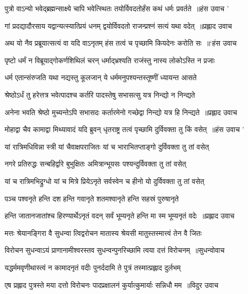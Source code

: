 \threelineshloka
{पुत्रो वाऽन्यो भवेद्ब्रह्मन्साक्ष्ये चापि भवेत्स्थितः}
{तयोर्विवदतोर्हंस कथं धर्मः प्रवर्तते ॥हंस उवाच}
{'}


\threelineshloka
{गां प्रदद्यादौरसाय यद्वान्यत्स्यात्प्रियं धनम्}
{द्वयोर्विवदतो राजन्प्रश्नं सत्यं यथा वदेत् ॥प्रह्लाद उवाच}
{}


\twolineshloka
{अथ यो नैव प्रब्रूयात्सत्यं वा यदि वाऽनृतम्}
{हंस तत्वं च पृच्छामि कियदेनः करोति सः ॥`हंस उवाच}


\threelineshloka
{पृष्टो धर्मं न विब्रूयाद्गोकर्णशिथिलं चरन्}
{धर्माद्भ्रश्यति राजंस्तु नास्य लोकोऽस्ति न प्रजाः}
{}


\twolineshloka
{धर्म एतान्संरुजति यथा नद्यस्तु कूलजान्}
{ये धर्ममनुपश्यन्तस्तूष्णीं ध्यायन्त आसते}


\twolineshloka
{श्रेष्ठोऽर्धं तु हरेत्तत्र भवेत्पादश्च कर्तरि}
{पादस्तेषु सभासत्सु यत्र निन्द्यो न निन्द्यते}


\threelineshloka
{अनेना भवति श्रेष्ठो मुच्यन्तेऽपि सभासदः}
{कर्तारमेनो गच्छेद्वा निन्द्यो यत्र हि निन्द्यते ॥प्रह्लाद उवाच}
{}


\threelineshloka
{मोहाद्वा चैव कामाद्वा मिथ्यावादं यदि ब्रुवन्}
{धृतराष्ट्र तत्वं पृच्छामि दुर्विवक्ता तु किं वसेत् ॥हंस उवाच}
{'}


\twolineshloka
{यां रात्रिमधिविन्ना स्त्री यां चैवाक्षपराजितः}
{यां च भाराभितप्ताङ्गो दुर्विवक्ता तु तां वसेत्}


\twolineshloka
{नगरे प्रतिरुद्धः सन्बहिर्द्वारे बुभुक्षितः}
{अमित्रान्भूयसः पश्यन्दुर्विवक्ता तु तां वसेत्}


\twolineshloka
{यां च रात्रिमभिद्रुग्धो यां च मित्रे प्रियेऽनृते}
{सर्वस्वेन च हीनो यो दुर्विवक्ता तु तां वसेत्}


\twolineshloka
{पञ्च पश्वनृते हन्ति दश हन्ति गवानृते}
{शतमश्वानृते हन्ति सहस्रं पुरुषानृते}


\threelineshloka
{हन्ति जातानजातांश्च हिरण्यार्थेऽनृतं वदन्}
{सर्वं भूम्यनृते हन्ति मा स्म भूम्यनृतं वदेः ॥प्रह्लाद उवाच}
{}


\twolineshloka
{मत्तः श्रेयानङ्गिरा वै सुधन्वा त्विद्वरोचन}
{मातास्य श्रेयसी मातुस्तस्मात्त्वं तेन वै जितः}


\threelineshloka
{विरोचन सुधन्वाऽयं प्राणानामीश्वरस्तव}
{सुधन्वन्पुनरिच्छामि त्वया दत्तं विरोचनम् ॥सुधन्वोवाच}
{}


\twolineshloka
{यद्धर्ममवृणीथास्त्वं न कामादनृतं वदीः}
{पुनर्ददामि ते पुत्रं तस्मात्प्रह्लाद दुर्लभम्}


\threelineshloka
{एष प्रह्लाद पुत्रस्ते मया दत्तो विरोचनः}
{पादप्रक्षालनं कुर्यात्कुमार्याः सन्निधौ मम ॥विदुर उवाच}
{}



